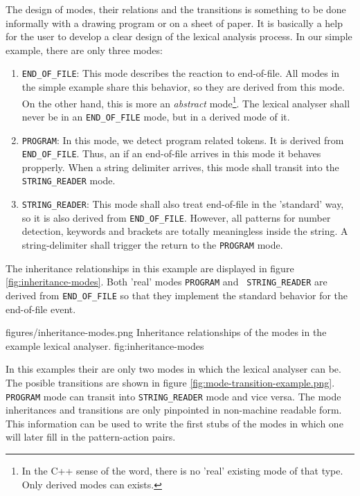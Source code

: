 The design of modes, their relations and the transitions is something 
to be done informally with a drawing program or on a sheet of paper.
It is basically a help for the user to develop a clear design of the lexical
analysis process. In our simple example, there are only three modes:

\begin{enumerate}
\item {\tt END\_OF\_FILE}: This mode describes the reaction to end-of-file.
  All modes in the simple example share this behavior, so they are derived
  from this mode. On the other hand, this is more an {\it abstract}
  mode\footnote{In the C++ sense of the word, there is no 'real' existing mode
  of that type. Only derived modes can exists.}. The lexical analyser shall
  never be in an {\tt END\_OF\_FILE} mode, but in a derived mode of it.
  
\item {\tt PROGRAM}: In this mode, we detect program related tokens. It is
  derived from {\tt END\_OF\_FILE}. Thus, an if an end-of-file arrives in this
  mode it behaves propperly. When a string delimiter arrives, this mode shall
  transit into the {\tt STRING\_READER} mode.
  
\item {\tt STRING\_READER}: This mode shall also treat end-of-file in the
  'standard' way, so it is also derived from {\tt END\_OF\_FILE}. However,
  all patterns for number detection, keywords and brackets are totally
  meaningless inside the string. A string-delimiter shall trigger the return
  to the {\tt PROGRAM} mode.
\end{enumerate}

The inheritance relationships in this example are displayed in figure
\ref{fig:inheritance-modes}. Both 'real' modes {\tt PROGRAM} and {\tt
  STRING\_READER} are derived from {\tt END\_OF\_FILE} so that they implement
the standard behavior for the end-of-file event.

\showpic
{figures/inheritance-modes.png}
{Inheritance relationships of the modes in the example lexical analyser.}
{fig:inheritance-modes}

In this examples their are only two modes in which the lexical analyser can
be. The posible transitions are shown in figure
\ref{fig:mode-transition-example.png}. {\tt PROGRAM} mode can transit into
{\tt STRING\_READER} mode and vice versa. The mode inheritances and
transitions are only pinpointed in non-machine readable form.  This
information can be used to write the first stubs of the modes in
which one will later fill in the pattern-action pairs. 

